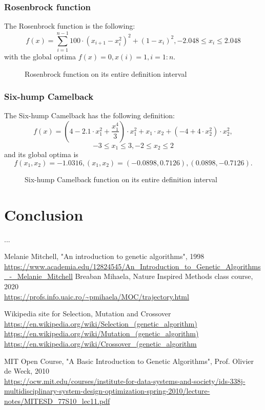 \documentclass{article}
\begin{document}
\subsubsection{Rosenbrock function}
The Rosenbrock function is the following:
$$f(x) = \sum_{i=1}^{n-1}100\cdot\left(x_{i+1} - x_i^2\right)^2 + \left(1 - x_i\right)^2, -2.048 \leq x_i \leq 2.048$$
with the global optima $f(x) = 0, x(i) = 1, i = 1:n$.
\begin{figure}[h!]
  \centering
  
  \caption{Rosenbrock function on its entire definition interval}
\end{figure}
\subsubsection{Six-hump Camelback}
The Six-hump Camelback has the following definition:
$$f(x) = \left(4 - 2.1 \cdot x_1^2 + \frac{x_1^4}{3}\right) \cdot x_1 ^2 + x_1 \cdot x_2 + \left(-4 + 4 \cdot x_2^2\right) \cdot x_2^2,$$ $$-3 \leq x_1 \leq 3, -2 \leq x_2 \leq 2$$
and its global optima is $$f(x_1, x_2) = -1.0316, (x_1, x_2) = (-0.0898,0.7126), (0.0898,-0.7126).$$
\begin{figure}[h!]
  \centering
  
  \caption{Six-hump Camelback function on its entire definition interval}
\end{figure}

\section{Conclusion}
...


\begin{thebibliography}{9}
\bibitem{} 
Melanie Mitchell, "An introduction to genetic algorithms", 1998
\\\url{https://www.academia.edu/12824545/An_Introduction_to_Genetic_Algorithms_-_Melanie_Mitchell}
\bibitem{} 
Breaban Mihaela, Nature Inspired Methods class course, 2020
\\\url{https://profs.info.uaic.ro/~pmihaela/MOC/trajectory.html}

\bibitem{} 
Wikipedia site for Selection, Mutation and Crossover
\\\url{https://en.wikipedia.org/wiki/Selection_(genetic_algorithm)}
\\\url{https://en.wikipedia.org/wiki/Mutation_(genetic_algorithm)}
\\\url{https://en.wikipedia.org/wiki/Crossover_(genetic_algorithm}

\bibitem{}
MIT Open Course, "A Basic Introduction to Genetic Algorithms", Prof. Olivier de Weck, 2010
\\\url{https://ocw.mit.edu/courses/institute-for-data-systems-and-society/ids-338j-multidisciplinary-system-design-optimization-spring-2010/lecture-notes/MITESD_77S10_lec11.pdf}
\end{thebibliography}
\end{document}
